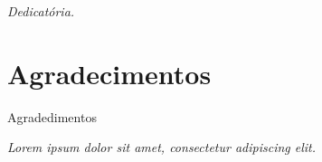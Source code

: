 \thispagestyle{empty}%
\null
\vfill
\hfill%
\begin{minipage}{.50\linewidth}
  \textit{Dedicatória.}
\end{minipage}

\chapter*{Agradecimentos}
  Agradedimentos

\cleardoublepage %
\null
\vfill
\hfill%
\begin{minipage}{.50\linewidth}
    \textit{Lorem ipsum dolor sit amet, consectetur adipiscing elit.}
\end{minipage}
